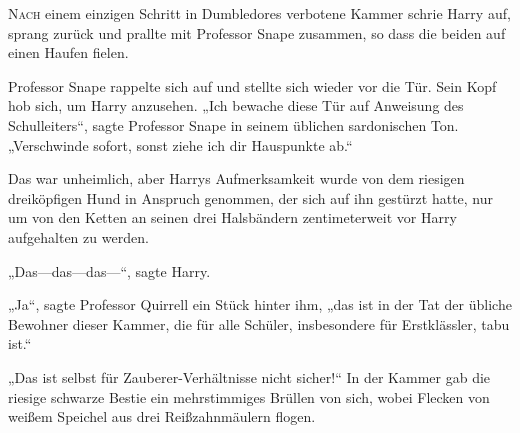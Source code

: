 
\lettrine{N}{ach} einem einzigen Schritt in Dumbledores verbotene Kammer schrie Harry auf, sprang zurück und prallte mit Professor Snape zusammen, so dass die beiden auf einen Haufen fielen.

Professor Snape rappelte sich auf und stellte sich wieder vor die Tür. Sein Kopf hob sich, um Harry anzusehen.
„Ich bewache diese Tür auf Anweisung des Schulleiters“, sagte Professor Snape in seinem üblichen sardonischen Ton. „Verschwinde sofort, sonst ziehe ich dir Hauspunkte ab.“

Das war unheimlich, aber Harrys Aufmerksamkeit wurde von dem riesigen dreiköpfigen Hund in Anspruch genommen, der sich auf ihn gestürzt hatte, nur um von den Ketten an seinen drei Halsbändern zentimeterweit vor Harry aufgehalten zu werden.

„Das—das—das—“, sagte Harry.

„Ja“, sagte Professor Quirrell ein Stück hinter ihm, „das ist in der Tat der übliche Bewohner dieser Kammer, die für alle Schüler, insbesondere für Erstklässler, tabu ist.“

„Das ist selbst für Zauberer-Verhältnisse nicht sicher!“ In der Kammer gab die riesige schwarze Bestie ein mehrstimmiges Brüllen von sich, wobei Flecken von weißem Speichel aus drei Reißzahnmäulern flogen.

